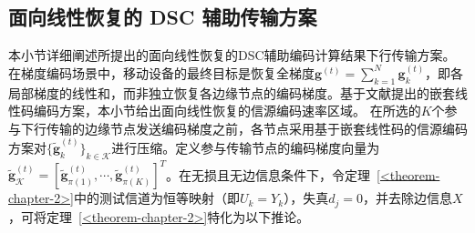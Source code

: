 \subsection{面向线性恢复的 DSC 辅助传输方案}\label{4.3}
本小节详细阐述所提出的面向线性恢复的DSC辅助编码计算结果下行传输方案。在梯度编码场景中，移动设备的最终目标是恢复全梯度$\mathbf{g}^{(t)}=\sum_{k=1}^N\mathbf{g}_k^{(t)}$，即各局部梯度的线性和，而非独立恢复各边缘节点的编码梯度。基于文献\cite{lim2019towards}提出的嵌套线性码编码方案，本小节给出面向线性恢复的信源编码速率区域。
在所选的$K$个参与下行传输的边缘节点发送编码梯度之前，各节点采用基于嵌套线性码的信源编码方案对$\{\tilde{\mathbf{g}}_k^{(t)}\}_{k\in\mathcal{K}}$进行压缩。定义参与传输节点的编码梯度向量为$\tilde{\mathbf{g}}_{\mathcal{K}}^{(t)}=[\tilde{\mathbf{g}}_{\pi(1)}^{(t)},\cdots,\tilde{\mathbf{g}}_{\pi(K)}^{(t)}]^T$。在无损且无边信息条件下，令定理~\ref{<theorem-chapter-2>}中的测试信道为恒等映射（即$U_k=Y_k$），失真$d_j=0$，并去除边信息$X$，可将定理~\ref{<theorem-chapter-2>}特化为以下推论。
